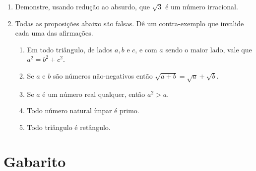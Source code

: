 \begin{enumerate}
\begin{enumerate}
        \item Se $x^2$ é ímpar, então $x$ é ímpar.
        \item Se $x+y$ é divisível por $2$ então $x-y$ é divisível por $2$.
    \end{enumerate}
     \item Demonstre, usando redução ao absurdo, que $\sqrt{3}$ é um número irracional.
     \item Todas as proposições abaixo são falsas. Dê um contra-exemplo que invalide cada uma das afirmações.
     \begin{enumerate}
         \item Em todo triângulo, de lados $a,b$ e $c$, e com $a$ sendo o maior lado, vale que $a^2=b^2+c^2$.
         \item Se $a$ e $b$ são números não-negativos então $\sqrt{a+b}= \sqrt{a}+ \sqrt{b}$.
         \item Se $a$ é um número real qualquer, então $a^2>a$.
         \item Todo número natural ímpar é primo.
         \item Todo triângulo é retângulo.
     \end{enumerate}
\end{enumerate}
\section{Gabarito}

